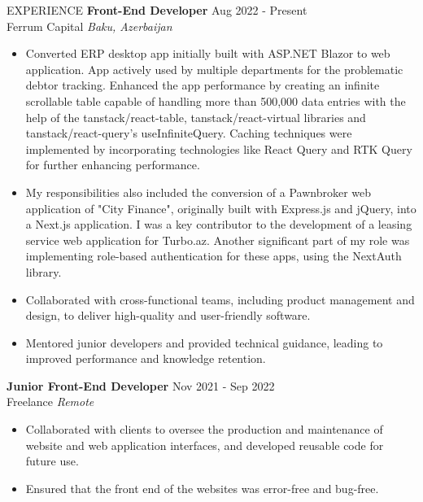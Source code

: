 \documentclass{resume} %
\begin{document}
\begin{rSection}{EXPERIENCE}
\textbf{Front-End Developer} \hfill Aug 2022 - Present\\
Ferrum Capital \hfill \textit{Baku, Azerbaijan}
 \begin{itemize}
    \itemsep -3pt {} 
    \item 
    Converted ERP desktop app initially built with ASP.NET Blazor to web application. App actively used by multiple departments for the problematic debtor tracking. Enhanced the app performance by creating an infinite scrollable table capable of handling more than 500,000 data entries with the help of the tanstack/react-table, tanstack/react-virtual libraries and tanstack/react-query's useInfiniteQuery. Caching techniques were implemented by incorporating technologies like React Query and RTK Query for further enhancing performance. 
    \item 
    My responsibilities also included the conversion of a Pawnbroker web application of "City Finance", originally built with Express.js and jQuery, into a Next.js application. I was a key contributor to the development of a leasing service web application for Turbo.az. Another significant part of my role was implementing role-based authentication for these apps, using the NextAuth library.
     \item Collaborated with cross-functional teams, including product management and design, to deliver high-quality and user-friendly software.
     \item Mentored junior developers and provided technical guidance, leading to improved performance and knowledge retention.
 \end{itemize}
 \vspace{2.5em}
\textbf{Junior Front-End Developer} \hfill Nov 2021 - Sep 2022\\
Freelance \hfill \textit{Remote}
 \begin{itemize}
    \itemsep -3pt {} 
     \item Collaborated with clients to oversee the production and maintenance of website and web application interfaces, and developed reusable code for future use.
     \item Ensured that the front end of the websites was error-free and bug-free.
 \end{itemize}

\end{rSection} 

\end{document}
